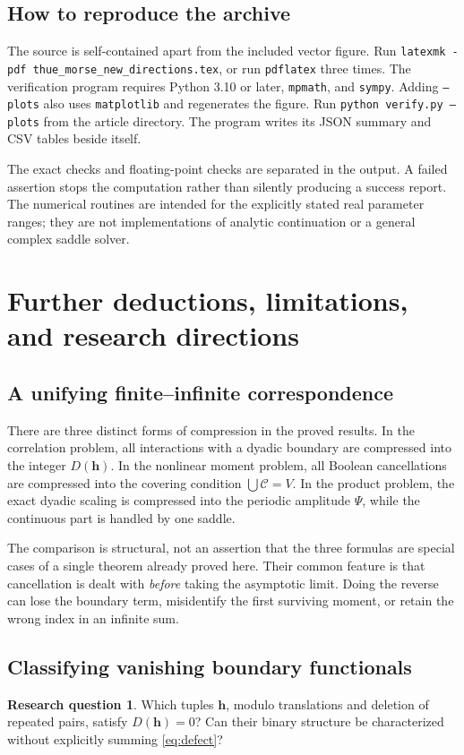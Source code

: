 \documentclass[11pt,oneside]{article}
\numberwithin{equation}{section}
\theoremstyle{definition}
\newtheorem{question}[theorem]{Research question}
\theoremstyle{remark}
\newcommand{\CCov}{\mathcal C}
\begin{document}
\subsection{How to reproduce the archive}
The source is self-contained apart from the included vector figure. Run
\texttt{latexmk -pdf thue\_morse\_new\_directions.tex}, or run
\texttt{pdflatex} three times. The verification program requires Python 3.10
or later, \texttt{mpmath}, and \texttt{sympy}. Adding \texttt{--plots} also
uses \texttt{matplotlib} and regenerates the figure. Run
\texttt{python verify.py --plots} from the article directory. The program writes
its JSON summary and CSV tables beside itself.

The exact checks and floating-point checks are separated in the output. A
failed assertion stops the computation rather than silently producing a
success report. The numerical routines are intended for the explicitly stated
real parameter ranges; they are not implementations of analytic continuation
or a general complex saddle solver.

\section{Further deductions, limitations, and research directions}
\label{sec:frontiers}

\subsection{A unifying finite--infinite correspondence}
There are three distinct forms of compression in the proved results.
In the correlation problem, all interactions with a dyadic boundary are
compressed into the integer \(D(\bm h)\). In the nonlinear moment problem,
all Boolean cancellations are compressed into the covering condition
\(\bigcup\CCov=V\). In the product problem, the exact dyadic scaling is
compressed into the periodic amplitude \(\Psi\), while the continuous part
is handled by one saddle.

The comparison is structural, not an assertion that the three formulas are
special cases of a single theorem already proved here. Their common feature
is that cancellation is dealt with \emph{before} taking the asymptotic limit.
Doing the reverse can lose the boundary term, misidentify the first surviving
moment, or retain the wrong index in an infinite sum.

\subsection{Classifying vanishing boundary functionals}
\begin{question}
Which tuples \(\bm h\), modulo translations and deletion of repeated pairs,
satisfy \(D(\bm h)=0\)? Can their binary structure be characterized without
explicitly summing \eqref{eq:defect}?
\end{question}
\end{document}

